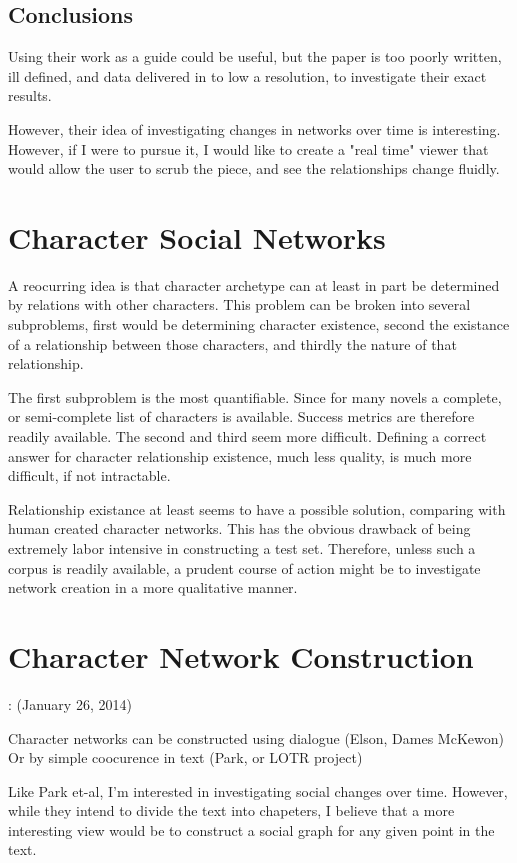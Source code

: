 \documentclass{report}\usepackage[]{graphicx}\usepackage[]{color}
\begin{document}
\subsection{Conclusions}
Using their work as a guide could be useful, but the paper is too poorly written, ill defined, and data delivered in to low a resolution, to investigate their exact results.

However, their idea of investigating changes in networks over time is interesting. However, if I were to pursue it, I would like to create a "real time" viewer that would allow the user to scrub the piece, and see the relationships change fluidly.

\section{Character Social Networks}
\date{January 26, 2014}

A reocurring idea is that character archetype can at least in part be determined by relations with other characters. This problem can be broken into several subproblems, first would be determining character existence, second the existance of a relationship between those characters, and thirdly the nature of that relationship. 

The first subproblem is the most quantifiable. Since for many novels a complete, or semi-complete list of characters is available. Success metrics are therefore readily available. The second and third seem more difficult. Defining a correct answer for character relationship existence, much less quality, is much more difficult, if not intractable. 

Relationship existance at least seems to have a possible solution, comparing with human created character networks. This has the obvious drawback of being extremely labor intensive in constructing a test set. Therefore, unless such a corpus is readily available, a prudent course of action might be to investigate network creation in a more qualitative manner.

\section{Character Network Construction}: (January 26, 2014)

Character networks can be constructed using dialogue (Elson, Dames McKewon)
Or by simple coocurence in text (Park, or LOTR project)

Like Park et-al, I'm interested in investigating social changes over time. However, while they intend to divide the text into chapeters, I believe that a more interesting view would be to construct a social graph for any given point in the text. 
\end{document}

